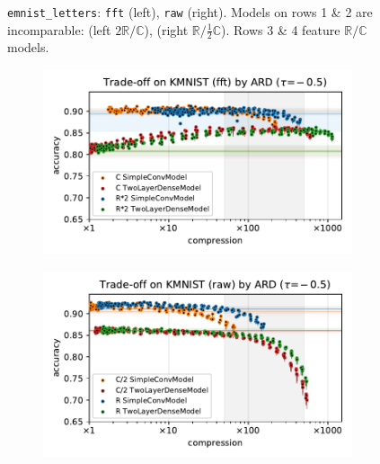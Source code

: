\documentclass[a4paper,10pt,onecolumn]{article}
\newcommand{\real}{\mathbb{R}}
\newcommand{\cplx}{\mathbb{C}}
\begin{document}
\begin{figure}[b]
\begin{subfigure}[b]{0.5\columnwidth}
  \end{subfigure}
  \caption{%
    \texttt{emnist\_letters}:
      \texttt{fft} (left), \texttt{raw} (right).
      Models on rows 1 \& 2 are incomparable: (left $2\real / \cplx$), (right $\real / \tfrac12\cplx$).
      Rows 3 \& 4 feature $\real / \cplx$ models.
  }
\end{figure}

\begin{figure}[b]
  \centering
  \begin{subfigure}[b]{0.5\columnwidth}
    \centering
    \includegraphics[width=\columnwidth]{figure__mnist-like__trade-off/appendix__cmp__ARD__kmnist__fft__-0.5.pdf}
  \end{subfigure}%
  \begin{subfigure}[b]{0.5\columnwidth}
    \centering
    \includegraphics[width=\columnwidth]{figure__mnist-like__trade-off/appendix__cmp__ARD__kmnist__raw__-0.5.pdf}

\end{subfigure}
\end{figure}
\end{document}
